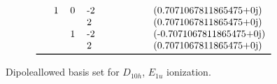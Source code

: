\documentclass[letterpaper,table,10pt,english]{jupyterBook}
\begin{document}
\begin{figure}[htbp]
\begin{equation*}
\begin{split}
\begin{tabular}{lllllllll}
    & 1 & 0 & -2 &         &   &                           &   &   (0.7071067811865475+0j) \\
    &   &   &  2 &         &   &                           &   &   (0.7071067811865475+0j) \\
    &   & 1 & -2 &         &   &                           &   &  (-0.7071067811865475+0j) \\
    &   &   &  2 &         &   &                           &   &   (0.7071067811865475+0j) \\
\bottomrule
\end{tabular}\end{split}
\end{equation*}\caption{Dipole\sphinxhyphen{}allowed basis set for \(D_{10h}\), \(E_{1u}\) ionization.}\label{\detokenize{part2/sym-fitting-intro_240723:fig-dipoletermsd10hbasis}}\end{figure}
\end{document}
